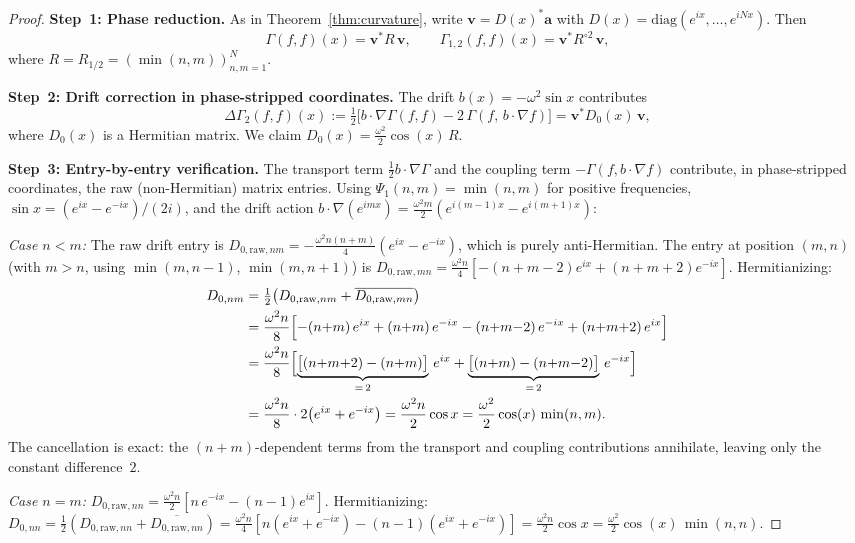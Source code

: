 \documentclass[11pt,a4paper]{article}
\theoremstyle{plain}
\theoremstyle{definition}
\theoremstyle{remark}
\begin{document}
\begin{proof}
\textbf{Step~1: Phase reduction.}
As in Theorem~\ref{thm:curvature}, write $\mathbf{v} = D(x)^*\mathbf{a}$
with $D(x) = \mathrm{diag}(e^{ix},\ldots,e^{iNx})$.  Then
\[
  \Gamma(f,f)(x) = \mathbf{v}^* R\,\mathbf{v}, \qquad
  \Gamma_{1,2}(f,f)(x) = \mathbf{v}^* R^{\circ 2}\,\mathbf{v},
\]
where $R = R_{1/2} = (\min(n,m))_{n,m=1}^N$.

\textbf{Step~2: Drift correction in phase-stripped coordinates.}
The drift $b(x) = -\omega^2\sin x$ contributes
\[
  \Delta\Gamma_2(f,f)(x) := \tfrac{1}{2}\bigl[
    b\cdot\nabla\Gamma(f,f) - 2\,\Gamma(f,\,b\cdot\nabla f)
  \bigr]
  = \mathbf{v}^* D_0(x)\,\mathbf{v},
\]
where $D_0(x)$ is a Hermitian matrix.  We claim
$D_0(x) = \tfrac{\omega^2}{2}\cos(x)\,R$.

\textbf{Step~3: Entry-by-entry verification.}
The transport term $\frac{1}{2}b\cdot\nabla\Gamma$ and the
coupling term $-\Gamma(f,b\cdot\nabla f)$ contribute, in
phase-stripped coordinates, the raw (non-Hermitian) matrix entries.
Using $\Psi_1(n,m) = \min(n,m)$ for positive frequencies,
$\sin x = (e^{ix}-e^{-ix})/(2i)$, and the drift action
$b\cdot\nabla(e^{imx}) = \frac{\omega^2 m}{2}(e^{i(m-1)x}-e^{i(m+1)x})$:

\emph{Case $n < m$:}
The raw drift entry is
$D_{0,\mathrm{raw},nm} = -\frac{\omega^2 n(n+m)}{4}(e^{ix}-e^{-ix})$,
which is purely anti-Hermitian.
The entry at position $(m,n)$ (with $m > n$, using
$\min(m,n{-}1)$, $\min(m,n{+}1)$) is
$D_{0,\mathrm{raw},mn}
= \frac{\omega^2 n}{4}[-(n{+}m{-}2)e^{ix}+(n{+}m{+}2)e^{-ix}]$.
Hermitianizing:
\begin{align*}
  D_{0,nm}
  &= \tfrac{1}{2}\bigl(D_{0,\mathrm{raw},nm}
     + \overline{D_{0,\mathrm{raw},mn}}\bigr) \\
  &= \frac{\omega^2 n}{8}\Bigl[
    -(n{+}m)\,e^{ix} + (n{+}m)\,e^{-ix}
    -(n{+}m{-}2)\,e^{-ix} + (n{+}m{+}2)\,e^{ix}
  \Bigr] \\
  &= \frac{\omega^2 n}{8}\Bigl[
    \underbrace{\bigl[(n{+}m{+}2)-(n{+}m)\bigr]}_{=\,2}\,e^{ix}
    +\underbrace{\bigl[(n{+}m)-(n{+}m{-}2)\bigr]}_{=\,2}\,e^{-ix}
  \Bigr] \\
  &= \frac{\omega^2 n}{8}\cdot 2\bigl(e^{ix}+e^{-ix}\bigr)
  = \frac{\omega^2 n}{2}\cos x
  = \frac{\omega^2}{2}\cos(x)\,\min(n,m).
\end{align*}
The cancellation is exact: the $(n{+}m)$-dependent terms from
the transport and coupling contributions annihilate, leaving
only the constant difference~$2$.

\emph{Case $n = m$:}
$D_{0,\mathrm{raw},nn}
= \frac{\omega^2 n}{2}[n\,e^{-ix}-(n{-}1)e^{ix}]$.
Hermitianizing: $D_{0,nn}
= \frac{1}{2}(D_{0,\mathrm{raw},nn} + \overline{D_{0,\mathrm{raw},nn}})
= \frac{\omega^2 n}{4}[n(e^{ix}+e^{-ix})-(n{-}1)(e^{ix}+e^{-ix})]
= \frac{\omega^2 n}{2}\cos x
= \frac{\omega^2}{2}\cos(x)\,\min(n,n)$.


\end{proof}
\end{document}
